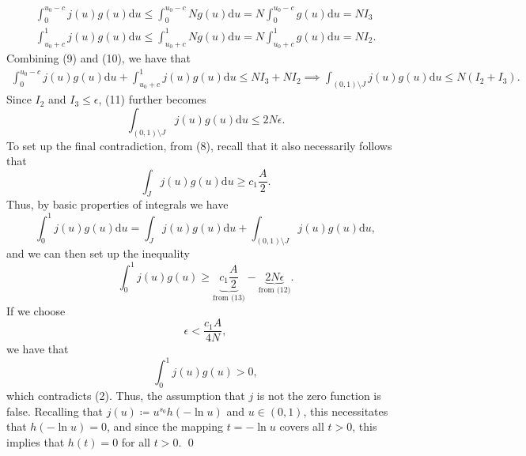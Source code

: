\documentclass[12pt]{article}
\theoremstyle{plain}
\theoremstyle{definition}
\begin{document}
\begin{align}
    \int_{0}^{u_0-c}j(u)g(u)\mathrm{d}u \leq \int_{0}^{u_0-c} Ng(u)\mathrm{d}u = N\int_{0}^{u_0-c}g(u)\mathrm{d}u = NI_3 \\
    \int_{u_0+c}^{1}j(u)g(u)\mathrm{d}u \leq \int_{u_0+c}^{1} Ng(u)\mathrm{d}u = N\int_{u_0+c}^{1}g(u)\mathrm{d}u = NI_2.
\end{align}
Combining (9) and (10), we have that
\begin{align}
    \int_{0}^{u_0-c}j(u)g(u)\mathrm{d}u + \int_{u_0+c}^{1}j(u)g(u)\mathrm{d}u \leq NI_3 + NI_2 \implies \int_{(0,1)\setminus J}j(u)g(u)\mathrm{d}u \leq N(I_2+I_3).
\end{align}
Since $I_2$ and $I_3\leq \epsilon$, (11) further becomes
\begin{equation}
    \int_{(0,1)\setminus J}j(u)g(u)\mathrm{d}u \leq 2N\epsilon.
\end{equation}
To set up the final contradiction, from (8), recall that it also necessarily follows that
\begin{equation}
    \int_J j(u)g(u)\mathrm{d}u \geq c_1 \frac{A}{2}.
\end{equation}
Thus, by basic properties of integrals we have
\begin{equation}
    \int_{0}^{1} j(u)g(u) \mathrm{d}u = \int_J j(u)g(u)\mathrm{d}u + \int_{(0,1)\setminus J}j(u)g(u)\mathrm{d}u,
\end{equation}
and we can then set up the inequality
\begin{equation}
    \int_{0}^{1} j(u)g(u) \geq \underbrace{ c_1\frac{A}{2}}_{\text{from (13)}} - \underbrace{2N\epsilon}_{\text{from (12)}}.
\end{equation}
If we choose
\begin{equation}
    \epsilon < \frac{c_1 A}{4N},
\end{equation}
we have that
\begin{equation}
    \int_{0}^{1} j(u)g(u) > 0,
\end{equation}
which contradicts (2). Thus, the assumption that $j$ is not the zero function is false. Recalling that $j(u)\coloneq u^{s_0}h(-\ln u)$ and $u\in (0,1)$, this necessitates that $h(-\ln u)=0$, and since the mapping $t=-\ln u$ covers all $t>0$, this implies that $h(t)=0$ for all $t>0$. \qed

\end{document}

